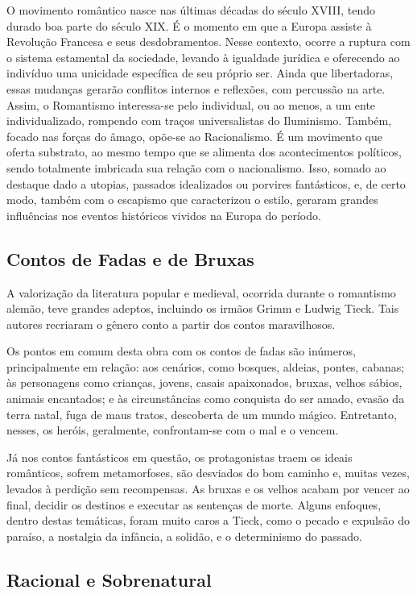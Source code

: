 \documentclass[11pt]{extarticle}
\begin{document}
O movimento romântico nasce nas últimas décadas do século XVIII, tendo
durado boa parte do século XIX. É o momento em que a Europa assiste à
Revolução Francesa e seus desdobramentos. Nesse contexto, ocorre a
ruptura com o sistema estamental da sociedade, levando à igualdade
jurídica e oferecendo ao indivíduo uma unicidade específica de seu
próprio ser. Ainda que libertadoras, essas mudanças gerarão conflitos
internos e reflexões, com percussão na arte. Assim, o Romantismo
interessa-se pelo individual, ou ao menos, a um ente individualizado,
rompendo com traços universalistas do Iluminismo. Também, focado nas
forças do âmago, opõe-se ao Racionalismo. É um movimento que oferta
substrato, ao mesmo tempo que se alimenta dos acontecimentos políticos,
sendo totalmente imbricada sua relação com o nacionalismo. Isso, somado
ao destaque dado a utopias, passados idealizados ou porvires
fantásticos, e, de certo modo, também com o escapismo que caracterizou o
estilo, geraram grandes influências nos eventos históricos vividos na
Europa do período.

\subsection{Contos de Fadas e de Bruxas}

A valorização da literatura popular e medieval, ocorrida durante o
romantismo alemão, teve grandes adeptos, incluindo os irmãos Grimm e
Ludwig Tieck. Tais autores recriaram o gênero conto a partir dos contos
maravilhosos.

Os pontos em comum desta obra com os contos de fadas são inúmeros,
principalmente em relação: aos cenários, como bosques, aldeias, pontes,
cabanas; às personagens como crianças, jovens, casais apaixonados,
bruxas, velhos sábios, animais encantados; e às circunstâncias como
conquista do ser amado, evasão da terra natal, fuga de maus tratos,
descoberta de um mundo mágico. Entretanto, nesses, os heróis,
geralmente, confrontam-se com o mal e o vencem.

Já nos contos fantásticos em questão, os protagonistas traem os ideais
românticos, sofrem metamorfoses, são desviados do bom caminho e, muitas
vezes, levados à perdição sem recompensas. As bruxas e os velhos acabam
por vencer ao final, decidir os destinos e executar as sentenças de
morte. Alguns enfoques, dentro destas temáticas, foram muito caros a
Tieck, como o pecado e expulsão do paraíso, a nostalgia da infância, a
solidão, e o determinismo do passado.

\subsection{Racional e Sobrenatural}
\end{document}
